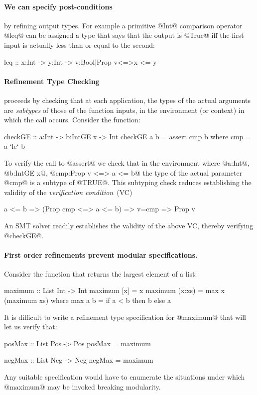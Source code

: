 \paragraph{We can specify post-conditions} by refining output types. 
For example a primitive @Int@ comparison operator @leq@ can be 
assigned a type that says that the output is @True@ iff the 
first input is actually less than or equal to the second:
%
\begin{code}
leq :: x:Int -> y:Int -> {v:Bool|Prop v<=>x <= y}
\end{code}

\paragraph{Refinement Type Checking} proceeds by checking that at each
application, the types of the actual arguments are \emph{subtypes} 
of those of the function inputs, in the environment (or context) in 
which the call occurs. 
%
Consider the function:
%
\begin{code}
    checkGE     :: a:Int -> b:IntGE x -> Int
    checkGE a b = assert cmp b
      where
        cmp     = a `le` b
\end{code}
%
To verify the call to @assert@ we check that in the environment 
where @a:Int@, @b:IntGE x@, @cmp:Prop v <=> a <= b@ the type of the 
actual parameter @cmp@ is a subtype of @TRUE@. 
%
This subtyping check reduces establishing the validity of the 
\emph{verification condition}~(VC)
%
\begin{code}
 a <= b => (Prop cmp <=> a <= b) => v=cmp => Prop v
\end{code}
%
An SMT solver \cite{NelsonOppen} readily establishes the validity
of the above VC, thereby verifying @checkGE@.


\paragraph{First order refinements prevent modular specifications.} 
Consider the function that returns the largest element of a list:
% 
\begin{code}
    maximum        :: List Int -> Int 
    maximum [x]    = x
    maximum (x:xs) = max x (maximum xs)
      where
        max a b    = if a < b then b else a 
\end{code}
%
It is difficult to write a refinement type specification for 
@maximum@ that will let us verify that:
%
\begin{code}
    posMax :: List Pos -> Pos 
    posMax = maximum
    
    negMax :: List Neg -> Neg 
    negMax = maximum
\end{code}
%
Any suitable specification would have to enumerate the 
situations under which @maximum@ may be invoked 
breaking modularity.

